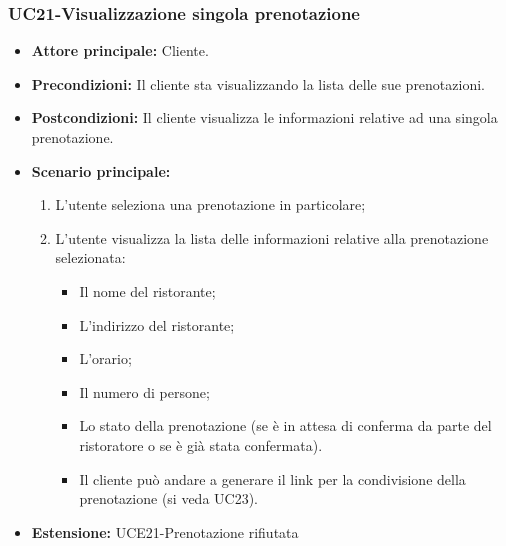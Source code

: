 \subsubsection{UC21-Visualizzazione singola prenotazione}
\begin{itemize}
    \item \textbf{Attore principale: } Cliente.
    \item \textbf{Precondizioni: }Il cliente sta visualizzando la lista delle sue prenotazioni.
    \item \textbf{Postcondizioni: }Il cliente visualizza le informazioni relative ad una singola prenotazione.
    \item \textbf{Scenario principale:}
        \begin{enumerate}
            \item L'utente seleziona una prenotazione in particolare;
            \item L'utente visualizza la lista delle informazioni relative alla prenotazione selezionata:
            \begin{itemize}
                \item Il nome del ristorante;
                \item L'indirizzo del ristorante;
                \item L'orario;
                \item Il numero di persone;
                \item Lo stato della prenotazione (se è in attesa di conferma da parte del ristoratore
                o se è già stata confermata).
            \item Il cliente può andare a generare il link per la condivisione della prenotazione (si veda UC23).
            \end{itemize}
        \end{enumerate}
    \item \textbf{Estensione: }UCE21-Prenotazione rifiutata
\end{itemize}

